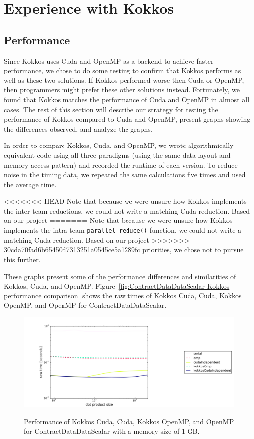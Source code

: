 \chapter{Experience with Kokkos}
\section{Performance}
Since Kokkos uses Cuda and OpenMP as a backend to achieve faster performance, we
chose to do some testing to confirm that Kokkos performs as well as these two
solutions. If Kokkos performed worse then Cuda or OpenMP, then programmers might
prefer these other solutions instead.  Fortunately, we found that Kokkos matches
the performance of Cuda and OpenMP in almost all cases.  The rest of this
section will describe our strategy for testing the performance of Kokkos
compared to Cuda and OpenMP, present graphs showing the differences observed,
and analyze the graphs.

In order to compare Kokkos, Cuda, and OpenMP, we wrote algorithmically
equivalent code using all three paradigms (using the same data layout and memory
access pattern) and recorded the runtime of each version.  To reduce noise in
the timing data, we repeated the same calculations five times and used the
average time.

<<<<<<< HEAD
Note that because we were unsure how Kokkos implements the inter-team reductions, 
we could not write a matching Cuda reduction.  Based on our project
=======
Note that because we were unsure how Kokkos implements the intra-team \texttt{parallel\_reduce()}
function, we could not write a matching Cuda reduction.  Based on our project
>>>>>>> 30cda70fad6b65450d7313251a0545ce5a1289fc
priorities, we chose not to pursue this further.

These graphs present some of the performance differences and similarities of
Kokkos, Cuda, and OpenMP. Figure~\ref{fig:ContractDataDataScalar Kokkos
performance comparison} shows the raw times of Kokkos Cuda, Cuda, Kokkos OpenMP,
and OpenMP for ContractDataDataScalar.

\begin{figure}[!ht]
{\includegraphics[scale=.4]{CDDS_RawTimes_2d_largestSize_ComparisonFixed.pdf}}
\caption[ContractDataDataScalar Kokkos performance comparison]{
    Performance of Kokkos Cuda, Cuda, Kokkos OpenMP,
and OpenMP for ContractDataDataScalar with a memory size of 1 GB.}
\label{fig:ContractDataDataScalar Kokkos performance comparison}
\end{figure}

